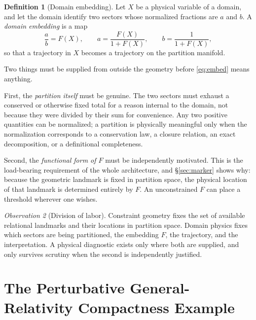 \documentclass[11pt,a4paper]{article}
\theoremstyle{definition}
\newtheorem{definition}{Definition}[section]
\theoremstyle{plain}
\theoremstyle{remark}
\newtheorem{observation}[definition]{Observation}
\begin{document}
\begin{definition}[Domain embedding]
\label{def:embedding}
Let $X$ be a physical variable of a domain, and let the domain identify two
sectors whose normalized fractions are $a$ and $b$. A \emph{domain embedding}
is a map
\begin{equation}
\frac{a}{b}=F(X),
\qquad
a=\frac{F(X)}{1+F(X)},
\qquad
b=\frac{1}{1+F(X)} ,
\label{eq:embed}
\end{equation}
so that a trajectory in $X$ becomes a trajectory on the partition manifold.
\end{definition}

Two things must be supplied from outside the geometry before
\eqref{eq:embed} means anything.

First, the \emph{partition itself} must be genuine. The two sectors must
exhaust a conserved or otherwise fixed total for a reason internal to the
domain, not because they were divided by their sum for convenience. Any two
positive quantities can be normalized; a partition is physically meaningful
only when the normalization corresponds to a conservation law, a closure
relation, an exact decomposition, or a definitional completeness.

Second, the \emph{functional form of $F$} must be independently motivated. This
is the load-bearing requirement of the whole architecture, and \S\ref{sec:marker}
shows why: because the geometric landmark is fixed in partition space, the
physical location of that landmark is determined entirely by $F$. An
unconstrained $F$ can place a threshold wherever one wishes.

\begin{observation}[Division of labor]
\label{obs:labor}
Constraint geometry fixes the set of available relational landmarks and their
locations in partition space. Domain physics fixes which sectors are being
partitioned, the embedding $F$, the trajectory, and the interpretation. A
physical diagnostic exists only where both are supplied, and only survives
scrutiny when the second is independently justified.
\end{observation}

\section{The Perturbative General-Relativity Compactness Example}
\label{sec:gr}
\end{document}
